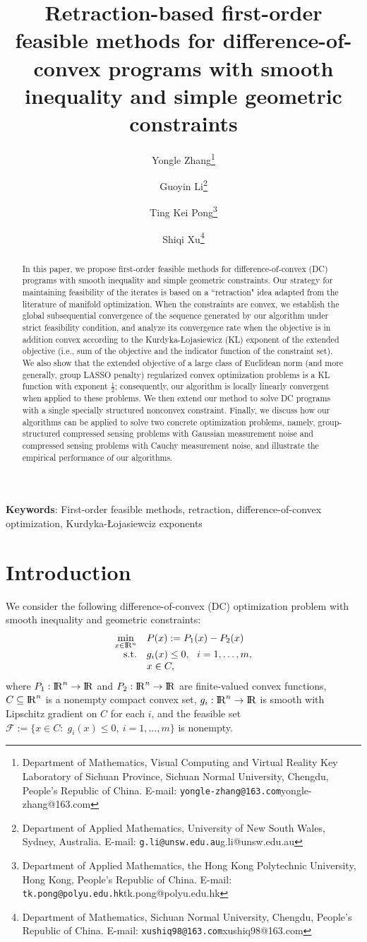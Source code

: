 \documentclass[10pt]{article}
\title{\sf Retraction-based first-order feasible methods for difference-of-convex programs with smooth inequality and simple geometric constraints}
\author{
Yongle Zhang\thanks{
        Department of Mathematics, Visual Computing and Virtual Reality Key Laboratory of Sichuan Province, Sichuan Normal University, Chengdu, People's Republic of China.
        E-mail: \texttt{yongle-zhang@163.com}{yongle-zhang@163.com}}
\and
Guoyin Li\thanks{
        Department of Applied Mathematics, University of New South Wales, Sydney, Australia.
        E-mail: \texttt{g.li@unsw.edu.au}{g.li@unsw.edu.au}}
\and
Ting Kei Pong\thanks{
		Department of Applied Mathematics, the Hong Kong Polytechnic University, Hong Kong, People's Republic of China.
		E-mail: \texttt{tk.pong@polyu.edu.hk}{tk.pong@polyu.edu.hk}}
\and
Shiqi Xu\thanks{
        Department of Mathematics, Sichuan Normal University, Chengdu, People's Republic of China.
        E-mail: \texttt{xushiq98@163.com}{xushiq98@163.com}}
}
\numberwithin{equation}{section}
\def\R{{\rm I\!R}}
\begin{document}
\maketitle

\begin{abstract}
  In this paper, we propose first-order feasible methods for difference-of-convex (DC) programs with smooth inequality and simple geometric constraints. Our strategy for maintaining feasibility of the iterates is based on a ``retraction" idea adapted from the literature of manifold optimization. When the constraints are convex, we establish the global subsequential convergence of the sequence generated by our algorithm under strict feasibility condition, and analyze its convergence rate when the objective is in addition convex according to the Kurdyka-{\L}ojasiewicz (KL) exponent of the extended objective (i.e., sum of the objective and the indicator function of the constraint set). We also show that the extended objective of a large class of Euclidean norm (and more generally, group LASSO penalty) regularized convex optimization problems is a KL function with exponent $\frac12$; consequently, our algorithm is locally linearly convergent when applied to these problems. We then extend our method to solve DC programs with a single specially structured nonconvex constraint. Finally, we discuss how our algorithms can be applied to solve two concrete optimization problems, namely, group-structured compressed sensing problems with Gaussian measurement noise and compressed sensing problems with Cauchy measurement noise, and illustrate the empirical performance of our algorithms.
\end{abstract}

{\small
{\bf Keywords}: First-order feasible methods, retraction, difference-of-convex optimization, Kurdyka-{\L}ojasiewciz exponents
}

\section{Introduction}
We consider the following difference-of-convex (DC) optimization problem with smooth inequality and geometric constraints:
\begin{equation}\label{P0}
  \begin{array}{rl}
\min\limits_{x\in\R^n} & P(x) := P_1(x) - P_2(x)\\
{\rm s.t.} & g_i(x)\leq 0,~~ i = 1,\ldots, m,\\
           & x\in C,
  \end{array}
\end{equation}
where $P_1:\R^n\rightarrow\R$ and $P_2:\R^n\rightarrow\R$ are {\color{black}finite-valued convex} functions, $C\subseteq \R^n$ is a nonempty compact convex set, $g_i:\R^n\rightarrow\R$ is smooth with Lipschitz gradient on $C$ for each $i$, and the feasible set $\mathcal{F} :=\{x\in C:\; g_i(x)\le 0, ~ i = 1,\ldots, m\}$ is nonempty.
\end{document}
